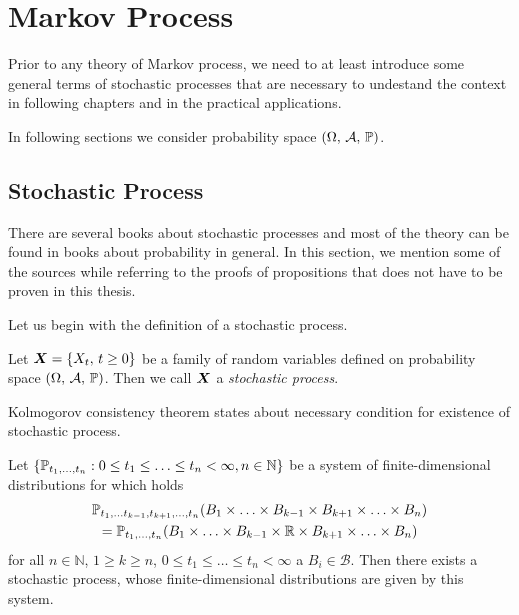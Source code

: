 \chapter{Markov Process}

Prior to any theory of Markov process, we need to at least introduce some general terms of stochastic processes that are necessary to undestand the context in following chapters and in the practical applications.

In following sections we consider probability space $(\Omega ,\, \mathcal{A} ,\, \operatorname{\mathbb{P}})$.


\section{Stochastic Process}
\label{chap:basics}

There are several books about stochastic processes and most of the theory can be found in books about probability in general. In this section, we mention some of the sources while referring to the proofs of propositions that does not have to be proven in this thesis.

Let us begin with the definition of a stochastic process.

\begin{definition}\label{stochProc}
	Let $\bm{X} = \{ X_t ,\, t \geq 0 \}$ be a family of random variables defined on probability space $(\Omega ,\, \mathcal{A} ,\, \operatorname{\mathbb{P}})$. Then we call $\bm{X}$ a \emph{stochastic process}.
\end{definition}

Kolmogorov consistency theorem states about necessary condition for existence of stochastic process.

\begin{theorem}\label{Kolmogorov}
  Let $\{\operatorname{\mathbb{P}}_{t_1, \ldots ,t_n}: 0\leq t_1\leq  \ldots  \leq t_n <\infty, n\in\mathbb{N} \}$ be a system of finite-dimensional distributions for which holds
	\begin{multline*}
		\operatorname{\mathbb{P}}_{t_1, \ldots t_{k-1},t_{k+1}, \ldots ,t_n}(B_1\times  \ldots \times B_{k-1} \times B_{k+1} \times  \ldots  \times B_n)\\
		= \operatorname{\mathbb{P}}_{t_1, \ldots ,t_n}(B_1\times \ldots \times B_{k-1} \times \mathbb{R} \times B_{k+1} \times  \ldots  \times B_n)
	\end{multline*}
	for all $n\in\mathbb{N}$, $1 \geq k \geq n$, $0\leq t_1\leq  \ldots  \leq t_n <\infty$ a $B_i \in \mathcal{B}$. Then there exists a stochastic process, whose finite-dimensional distributions are given by this system.
\end{theorem}

